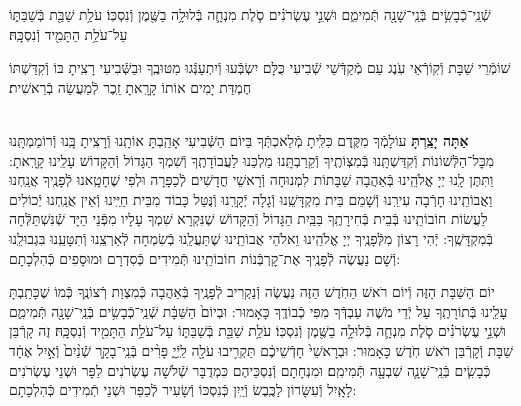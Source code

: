 \documentclass[twoside, openany, parskip=half, 11pt]{book}
\begin{document}
שְֿׁנֵֽי־כְֿבָשִׂ֥ים בְּֿנֵֽי־שָׁנָ֖ה תְּֿמִימִ֑ם וּשְׁנֵ֣י עֶשְׂרֹנִ֗ים סֹ֧לֶת מִנְחָ֛ה בְּֿלוּלָ֥ה בַשֶּׁ֖מֶן וְֿנִסְכּֽוֹ׃ עֹלַ֥ת שַׁבַּ֖ת בְּֿשַׁבַּתּ֑וֹ עַל־עֹלַ֥ת הַתָּמִ֖יד וְֿנִסְכָּֽהּ׃

שׁוֹמְֿרֵי שַׁבָּת וְֿקֽוֹרְֿאֵי עֹֽנֶג עַם מְֿקַדְּֿשֵׁי שְֿׁבִיעִי כֻּלָּם יִשְׂבְּֿעוּ וְֿיִתְעַנְּֿגוּ מִטּוּבֶֽךָ וּבַשְּֿׁבִיעִי רָצִֽיתָ בּוֹ וְֿקִדַּשְׁתּוֹ חֶמְדַּת יָמִים אוֹתוֹ קָרָֽאתָ זֵֽכֶר לְֿמַעֲשֵׂה בְֿרֵאשִׁית׃

\shabboskiddushhayom {}

\begin{sometimes}

\label{shabbosroshchodesh}
\\
\textbf{אַתָּה יָצַֽרְתָּ}
עוֹלָמְֿךָ מִקֶּֽדֶם כִּלִּֽיתָ מְֿלַאכְתְּֿךָ בַּיוֹם הַשְּֿׁבִיעִי אָהַֽבְתָּ אוֹתָֽנוּ וְֿרָצִֽיתָ בָּֽנוּ וְֿרוֹמַמְתָּֽנוּ מִכׇּל־הַלְּֿשׁוֹנוֹת וְֿקִדַּשְׁתָּֽנוּ בְּֿמִצְוֹתֶֽיךָ וְֿקֵרַבְתָּֽנוּ מַלְכֵּנוּ לַעֲבוֹדָתֶֽךָ וְֿשִׁמְךָ הַגָּדוֹל וְֿהַקָּדוֹשׁ עָלֵֽינוּ קָרָֽאתָ: וַתִּתֶּן לָֽנוּ יְיָ אֱלֹהֵֽינוּ בְּֿאַהֲבָה שַׁבָּתוֹת לִמְנוּחָה וְֿרָאשֵׁי חֳדָשִׁים לְֿכַפָּרָה וּלְפִי שֶׁחָטָֽאנוּ לְֿפָנֶֽיךָ אֲנַֽחְנוּ וַאֲבוֹתֵֽינוּ חָרְֿבָה עִירֵֽנוּ וְֿשָׁמֵם בֵּית מִקְדָּשֵֽׁנוּ וְֿגָלָה יְֿקָרֵֽנוּ וְֿנֻּטַּל כָּבוֹד מִבֵּית חַיֵּֽינוּ וְֿאֵין אֲנַֽחְנוּ יְֿכוֹלִים לַעֲשׂוֹת חוֹבוֹתֵֽינוּ בְּֿבֵית בְּֿחִירָתֶֽךָ בַּבַּֽיִת הַגָּדוֹל וְֿהַקָּדוֹשׁ שֶׁנִּקְרָא שִׁמְךָ עָלָיו מִפְּֿנֵי הַיָּד שְֿׁנִּשְׁתַּלְּֿחָה בְּֿמִקְדָּשֶֽׁךָ: יְֿהִי רָצוֹן מִלְּֿפָנֶֽיךָ יְיָ אֱלֹהֵֽינוּ וֵאלֹהֵי אֲבוֹתֵֽינוּ שֶׁתַּעֲלֵֽנוּ בְֿשִׂמְחָה לְֿאַרְצֵֽנוּ וְֿתִטָּעֵֽנוּ בִּגְבוּלֵֽנוּ וְֿשָׁם נַעֲשֶׂה לְֿפָנֶֽיךָ אֶת־קׇרְבְּֿנוֹת חוֹבוֹתֵֽינוּ תְּֿמִידִים כְּֿסִדְרָם וּמוּסָפִים כְּֿהִלְכָתָם:

יוֹם הַשַּׁבָּת הַזֶּה וְֿיוֹם רֹאשׁ הַחֹֽדֶשׁ הַזֶּה נַעֲשֶׂה וְֿנַקְרִיב לְֿפָנֶֽיךָ בְּֿאַהֲבָה כְּֿמִצְוַת רְֿצוֹנֶֽךָ כְּֿמוֹ שֶׁכָּתַֽבְתָּ עָלֵֽינוּ בְּֿתוֹרָתֶֽךָ עַל יְֿדֵי מֹשֶׁה עַבְדְּֿךָ מִפִּי כְֿבוֹדֶֽךָ כָּאָמוּר: וּבְיוֹם֙ הַשַּׁבָּ֔ת שְֿׁנֵֽי־כְֿבָשִׂ֥ים בְּֿנֵֽי־שָׁנָ֖ה תְּֿמִימִ֑ם וּשְׁנֵ֣י עֶשְׂרֹנִ֗ים סֹ֧לֶת מִנְחָ֛ה בְּֿלוּלָ֥ה בַשֶּׁ֖מֶן וְֿנִסְכּֽוֹ׃ עֹלַ֥ת שַׁבַּ֖ת בְּֿשַׁבַּתּ֑וֹ עַל־עֹלַ֥ת הַתָּמִ֖יד וְֿנִסְכָּֽהּ׃ זֶה קָרְֿבַּן שַׁבָּת וְֿקָרְֿבַּן רֹאשׁ חֹֽדֶשׁ כָּאָמוּר: וּבְרָאשֵׁי֙ חָדְֿשֵׁיכֶ֔ם תַּקְרִ֥יבוּ עֹלָ֖ה לַֽיְֿיָ֑ פָּרִ֨ים בְּֿנֵֽי־בָקָ֤ר שְֿׁנַ֨יִם֙ וְֿאַ֣יִל אֶחָ֔ד כְּֿבָשִׂ֧ים בְּֿנֵֽי־שָׁנָ֛ה שִׁבְעָ֖ה תְּֿמִימִֽם׃ וּמִנְחָתָם וְֿנִסְכֵּיהֶם כִּמְדֻבָּר שְֿׁלֹשָׁה עֶשְׂרֹנִים לַפָּר וּשְׁנֵי עֶשְׂרֹנִים לָאָֽיִל וְֿעִשָּׂרוֹן לַכֶּֽבֶשׂ וְֿיַֽיִן כְּֿנִסְכּוֹ וְֿשָׂעִיר לְֿכַפֵּר וּשְׁנֵי תְֿמִידִים כְּֿהִלְכָתָם:


\end{sometimes}
\end{document}
